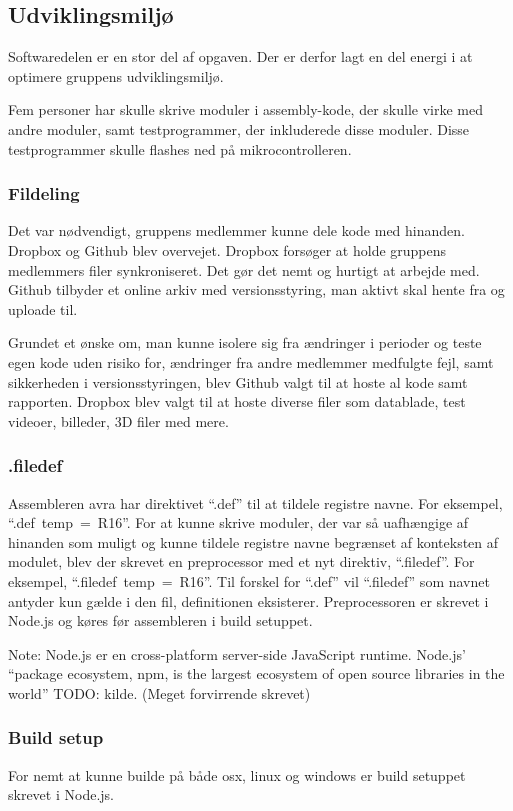 \subsection{Udviklingsmiljø}

Softwaredelen er en stor del af opgaven. Der er derfor lagt en del energi i at optimere gruppens udviklingsmiljø.

Fem personer har skulle skrive moduler i assembly-kode, der skulle virke med andre moduler, samt testprogrammer, der inkluderede disse moduler. Disse testprogrammer skulle flashes ned på mikrocontrolleren.

\subsubsection{Fildeling}
Det var nødvendigt, gruppens medlemmer kunne dele kode med hinanden. Dropbox og Github blev overvejet.
Dropbox forsøger at holde gruppens medlemmers filer synkroniseret.
Det gør det nemt og hurtigt at arbejde med.
Github tilbyder et online arkiv med versionsstyring, man aktivt skal hente fra og uploade til.

Grundet et ønske om, man kunne isolere sig fra ændringer i perioder og teste egen kode uden risiko for, ændringer fra andre medlemmer medfulgte fejl, samt sikkerheden i versionsstyringen, blev Github valgt til at hoste al kode samt rapporten.
Dropbox blev valgt til at hoste diverse filer som datablade, test videoer, billeder, 3D filer med mere.

\subsubsection{.filedef}
Assembleren avra har direktivet \mbox{``.def''} til at tildele registre navne. For eksempel, \mbox{``.def temp = R16''}.
For at kunne skrive moduler, der var så uafhængige af hinanden som muligt og kunne tildele registre navne begrænset af konteksten af modulet, blev der skrevet en preprocessor med et nyt direktiv, \mbox{``.filedef''}. For eksempel, \mbox{``.filedef temp = R16''}. Til forskel for \mbox{``.def''} vil \mbox{``.filedef''} som navnet antyder kun gælde i den fil, definitionen eksisterer. Preprocessoren er skrevet i Node.js og køres før assembleren i build setuppet.

\begin{mdquote}
	Note: Node.js er en cross-platform server-side JavaScript runtime. Node.js' ``package ecosystem, npm, is the largest ecosystem of open source libraries in the world'' TODO: kilde. (Meget forvirrende skrevet)
\end{mdquote}

\subsubsection{Build setup}
For nemt at kunne builde på både osx, linux og windows er build setuppet skrevet i Node.js.
